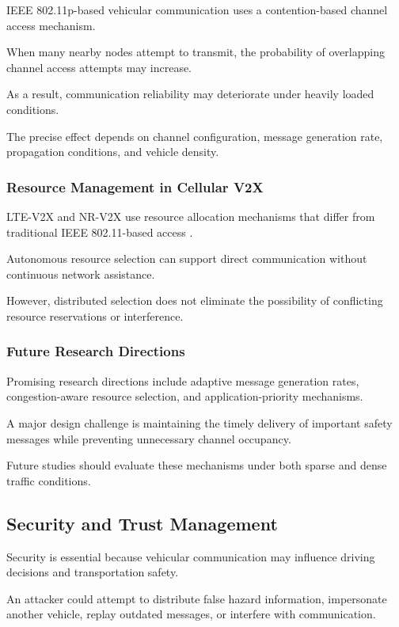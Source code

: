 IEEE 802.11p-based vehicular communication
uses a contention-based channel access
mechanism.

When many nearby nodes attempt to transmit,
the probability of overlapping channel
access attempts may increase.

As a result, communication reliability
may deteriorate under heavily loaded
conditions.

The precise effect depends on channel
configuration, message generation rate,
propagation conditions, and vehicle density.

\subsubsection{Resource Management in Cellular V2X}

LTE-V2X and NR-V2X use resource allocation
mechanisms that differ from traditional
IEEE 802.11-based access
\cite{Molina2017,Naik2019}.

Autonomous resource selection can support
direct communication without continuous
network assistance.

However, distributed selection does not
eliminate the possibility of conflicting
resource reservations or interference.

\subsubsection{Future Research Directions}

Promising research directions include
adaptive message generation rates,
congestion-aware resource selection,
and application-priority mechanisms.

A major design challenge is maintaining
the timely delivery of important safety
messages while preventing unnecessary
channel occupancy.

Future studies should evaluate these
mechanisms under both sparse and
dense traffic conditions.

\subsection{Security and Trust Management}

Security is essential because vehicular
communication may influence driving
decisions and transportation safety.

An attacker could attempt to distribute
false hazard information, impersonate
another vehicle, replay outdated messages,
or interfere with communication.

